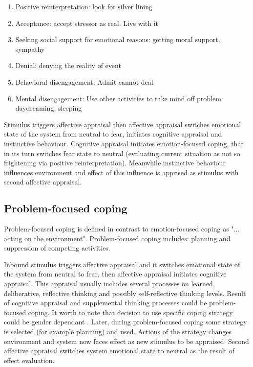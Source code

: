 \begin{enumerate}
\item  Positive reinterpretation: look for silver lining
\item  Acceptance: accept stressor as real. Live with it
\item  Seeking  social  support  for  emotional  reasons: getting moral support, sympathy
\item  Denial: denying the reality of event
\item  Behavioral disengagement: Admit cannot deal
\item  Mental  disengagement:  Use  other  activities  to take mind off problem: daydreaming, sleeping
\end{enumerate}



Stimulus triggers affective appraisal then affective appraisal switches emotional state of the system from neutral to fear, initiates cognitive appraisal and instinctive behaviour. Cognitive appraisal initiates emotion-focused coping, that in its turn switches fear state to neutral (evaluating current situation as not so frightening via positive reinterpretation). Meanwhile instinctive behaviour influences environment and effect of this influence is apprised as stimulus with second affective appraisal.

\subsection{Problem-focused coping}

Problem-focused coping is defined in contrast to emotion-focused coping as "... acting on the environment". Problem-focused coping includes: planning and suppression of competing activities.



Inbound stimulus triggers affective appraisal and it switches emotional state of the system from neutral to fear, then affective appraisal initiates cognitive appraisal. This appraisal usually includes several processes on learned, deliberative, reflective thinking and possibly self-reflective thinking levels. Result of cognitive appraisal and supplemental thinking processes could be problem-focused coping. It worth to note that decision to use specific coping strategy could be gender dependant \cite{sex_differencies}. Later, during problem-focused coping some strategy is selected (for example planning) and used. Actions of the strategy changes environment and system now faces effect as new stimulus to be appraised. Second affective appraisal switches system emotional state to neutral as the result of effect evaluation.

